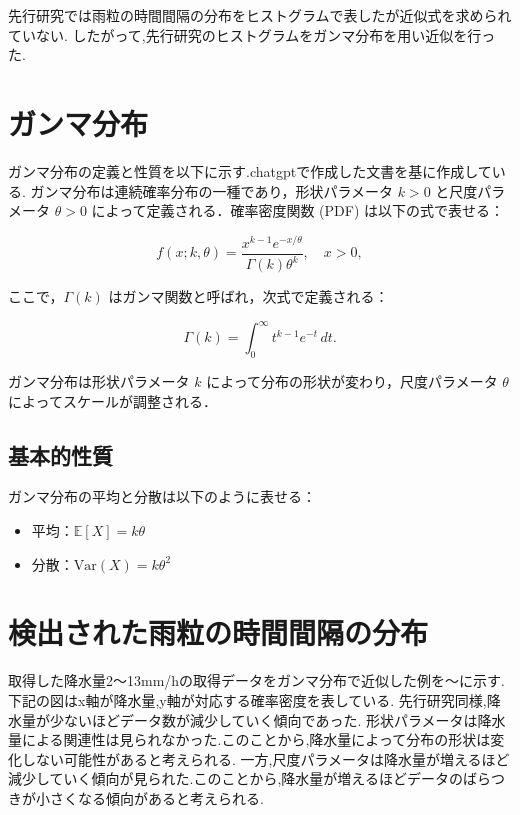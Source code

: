 先行研究\cite{mura}では雨粒の時間間隔の分布をヒストグラムで表したが近似式を求められていない.
したがって,先行研究\cite{mura}のヒストグラムをガンマ分布を用い近似を行った.

\section{ガンマ分布}
ガンマ分布の定義と性質を以下に示す.chatgpt\cite{gpt}で作成した文書を基に作成している.
ガンマ分布は連続確率分布の一種であり，形状パラメータ \( k > 0 \) と尺度パラメータ \( \theta > 0 \) によって定義される．確率密度関数 (PDF) は以下の式で表せる：

\begin{equation}
f(x; k, \theta) = \frac{x^{k-1} e^{-x/\theta}}{\Gamma(k) \theta^k}, \quad x > 0,
\end{equation}

ここで，\(\Gamma(k)\) はガンマ関数と呼ばれ，次式で定義される：

\begin{equation}
\Gamma(k) = \int_{0}^{\infty} t^{k-1} e^{-t} \, dt.
\end{equation}

ガンマ分布は形状パラメータ \( k \) によって分布の形状が変わり，尺度パラメータ \(\theta\) によってスケールが調整される．

\subsection{基本的性質}
ガンマ分布の平均と分散は以下のように表せる：
\vspace{3zh}
\begin{itemize}
    \item 平均：\(\mathbb{E}[X] = k \theta\)
    \item 分散：\(\mathrm{Var}(X) = k \theta^2\)
\end{itemize}

\vspace{10zh}
\section{検出された雨粒の時間間隔の分布}
取得した降水量2〜13mm/hの取得データをガンマ分布で近似した例を〜に示す.
下記の図はx軸が降水量,y軸が対応する確率密度を表している.
先行研究同様,降水量が少ないほどデータ数が減少していく傾向であった.
形状パラメータは降水量による関連性は見られなかった.このことから,降水量によって分布の形状は変化しない可能性があると考えられる.
一方,尺度パラメータは降水量が増えるほど減少していく傾向が見られた.このことから,降水量が増えるほどデータのばらつきが小さくなる傾向があると考えられる.
\vspace{7.0zh}

